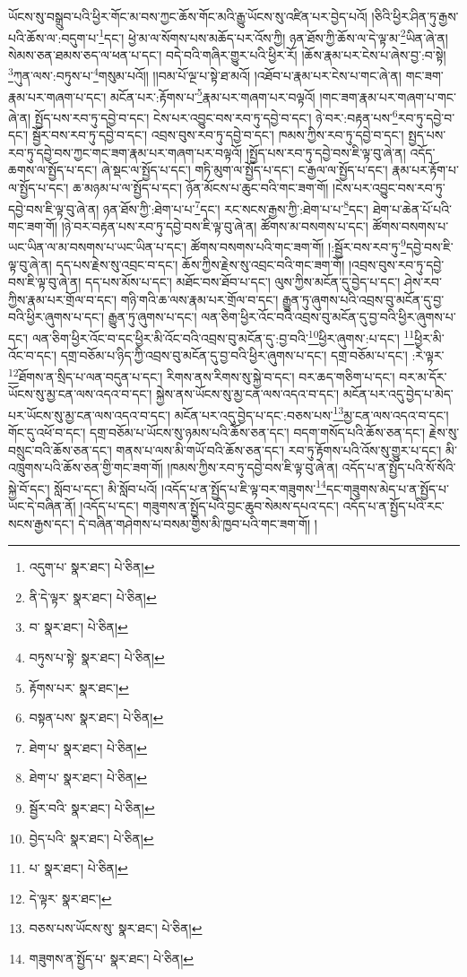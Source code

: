 ཡོངས་སུ་བསྒྲུབ་པའི་ཕྱིར་གོང་མ་བས་ཀྱང་ཆོས་གོང་མའི་རྒྱུ་ཡོངས་སུ་འཛིན་པར་བྱེད་པའོ། །ཅིའི་ཕྱིར་ཤིན་ཏུ་རྒྱས་པའི་ཆོས་ལ་:བདུག་པ་\footnote{འདུག་པ་  སྣར་ཐང་།  པེ་ཅིན། }དང་། ཕྱེ་མ་ལ་སོགས་པས་མཆོད་པར་འོས་ཀྱི། ཉན་ཐོས་ཀྱི་ཆོས་ལ་དེ་ལྟ་མ་\footnote{ནི་དེ་ལྟར་  སྣར་ཐང་།  པེ་ཅིན། }ཡིན་ཞེ་ན། སེམས་ཅན་ཐམས་ཅད་ལ་ཕན་པ་དང་། བདེ་བའི་གཞིར་གྱུར་པའི་ཕྱིར་རོ། །ཆོས་རྣམ་པར་ངེས་པ་ཞེས་བྱ་:བ་སྟེ། \footnote{བ་  སྣར་ཐང་།  པེ་ཅིན། }ཀུན་ལས་:བཏུས་པ་\footnote{བཏུས་པ་སྟེ་  སྣར་ཐང་།  པེ་ཅིན། }གསུམ་པའོ།། །།བམ་པོ་ལྔ་པ་སྟེ་ཐ་མའོ། །འཐོབ་པ་རྣམ་པར་ངེས་པ་གང་ཞེ་ན། གང་ཟག་རྣམ་པར་གཞག་པ་དང་། མངོན་པར་:རྟོགས་པ་\footnote{རྟོགས་པར་  སྣར་ཐང་། }རྣམ་པར་གཞག་པར་བལྟའོ། །གང་ཟག་རྣམ་པར་གཞག་པ་གང་ཞེ་ན། སྤྱོད་པས་རབ་ཏུ་དབྱེ་བ་དང་། ངེས་པར་འབྱུང་བས་རབ་ཏུ་དབྱེ་བ་དང་། ཉེ་བར་:བརྟན་པས་\footnote{བསྟན་པས་  སྣར་ཐང་།  པེ་ཅིན། }རབ་ཏུ་དབྱེ་བ་དང་། སྦྱོར་བས་རབ་ཏུ་དབྱེ་བ་དང་། འབྲས་བུས་རབ་ཏུ་དབྱེ་བ་དང་། ཁམས་ཀྱིས་རབ་ཏུ་དབྱེ་བ་དང་། སྤྱད་པས་རབ་ཏུ་དབྱེ་བས་ཀྱང་གང་ཟག་རྣམ་པར་གཞག་པར་བལྟའོ། །སྤྱོད་པས་རབ་ཏུ་དབྱེ་བས་ཇི་ལྟ་བུ་ཞེ་ན། འདོད་ཆགས་ལ་སྤྱོད་པ་དང་། ཞེ་སྡང་ལ་སྤྱོད་པ་དང་། གཏི་མུག་ལ་སྤྱོད་པ་དང་། ང་རྒྱལ་ལ་སྤྱོད་པ་དང་། རྣམ་པར་རྟོག་པ་ལ་སྤྱོད་པ་དང་། ཆ་མཉམ་པ་ལ་སྤྱོད་པ་དང་། ཉོན་མོངས་པ་ཆུང་བའི་གང་ཟག་གོ། །ངེས་པར་འབྱུང་བས་རབ་ཏུ་དབྱེ་བས་ཇི་ལྟ་བུ་ཞེ་ན། ཉན་ཐོས་ཀྱི་:ཐེག་པ་པ་\footnote{ཐེག་པ་  སྣར་ཐང་།  པེ་ཅིན། }དང་། རང་སངས་རྒྱས་ཀྱི་:ཐེག་པ་པ་\footnote{ཐེག་པ་  སྣར་ཐང་།  པེ་ཅིན། }དང་། ཐེག་པ་ཆེན་པོ་པའི་གང་ཟག་གོ། །ཉེ་བར་བརྟན་པས་རབ་ཏུ་དབྱེ་བས་ཇི་ལྟ་བུ་ཞེ་ན། ཚོགས་མ་བསགས་པ་དང་། ཚོགས་བསགས་པ་ཡང་ཡིན་ལ་མ་བསགས་པ་ཡང་ཡིན་པ་དང་། ཚོགས་བསགས་པའི་གང་ཟག་གོ། །:སྦྱོར་བས་རབ་ཏུ་\footnote{སྦྱོར་བའི་  སྣར་ཐང་།  པེ་ཅིན། }དབྱེ་བས་ཇི་ལྟ་བུ་ཞེ་ན། དད་པས་རྗེས་སུ་འབྲང་བ་དང་། ཆོས་ཀྱིས་རྗེས་སུ་འབྲང་བའི་གང་ཟག་གོ། །འབྲས་བུས་རབ་ཏུ་དབྱེ་བས་ཇི་ལྟ་བུ་ཞེ་ན། དད་པས་མོས་པ་དང་། མཐོང་བས་ཐོབ་པ་དང་། ལུས་ཀྱིས་མངོན་དུ་བྱེད་པ་དང་། ཤེས་རབ་ཀྱིས་རྣམ་པར་གྲོལ་བ་དང་། གཉི་གའི་ཆ་ལས་རྣམ་པར་གྲོལ་བ་དང་། རྒྱུན་ཏུ་ཞུགས་པའི་འབྲས་བུ་མངོན་དུ་བྱ་བའི་ཕྱིར་ཞུགས་པ་དང་། རྒྱུན་ཏུ་ཞུགས་པ་དང་། ལན་ཅིག་ཕྱིར་འོང་བའི་འབྲས་བུ་མངོན་དུ་བྱ་བའི་ཕྱིར་ཞུགས་པ་དང་། ལན་ཅིག་ཕྱིར་འོང་བ་དང་ཕྱིར་མི་འོང་བའི་འབྲས་བུ་མངོན་དུ་:བྱ་བའི་\footnote{བྱེད་པའི་  སྣར་ཐང་།  པེ་ཅིན། }ཕྱིར་ཞུགས་:པ་དང་། \footnote{པ་  སྣར་ཐང་།  པེ་ཅིན། }ཕྱིར་མི་འོང་བ་དང་། དགྲ་བཅོམ་པ་ཉིད་ཀྱི་འབྲས་བུ་མངོན་དུ་བྱ་བའི་ཕྱིར་ཞུགས་པ་དང་། དགྲ་བཅོམ་པ་དང་། :རེ་ལྟར་\footnote{དེ་ལྟར་  སྣར་ཐང་། }ཐོགས་ན་སྲིད་པ་ལན་བདུན་པ་དང་། རིགས་ནས་རིགས་སུ་སྐྱེ་བ་དང་། བར་ཆད་གཅིག་པ་དང་། བར་མ་དོར་ཡོངས་སུ་མྱ་ངན་ལས་འདའ་བ་དང་། སྐྱེས་ནས་ཡོངས་སུ་མྱ་ངན་ལས་འདའ་བ་དང་། མངོན་པར་འདུ་བྱེད་པ་མེད་པར་ཡོངས་སུ་མྱ་ངན་ལས་འདའ་བ་དང་། མངོན་པར་འདུ་བྱེད་པ་དང་:བཅས་པས་\footnote{བཅས་པས་ཡོངས་སུ་  སྣར་ཐང་།  པེ་ཅིན། }མྱ་ངན་ལས་འདའ་བ་དང་། གོང་དུ་འཕོ་བ་དང་། དགྲ་བཅོམ་པ་ཡོངས་སུ་ཉམས་པའི་ཆོས་ཅན་དང་། བདག་གསོད་པའི་ཆོས་ཅན་དང་། རྗེས་སུ་བསྲུང་བའི་ཆོས་ཅན་དང་། གནས་པ་ལས་མི་གཡོ་བའི་ཆོས་ཅན་དང་། རབ་ཏུ་རྟོགས་པའི་འོས་སུ་གྱུར་པ་དང་། མི་འཁྲུགས་པའི་ཆོས་ཅན་གྱི་གང་ཟག་གོ། །ཁམས་ཀྱིས་རབ་ཏུ་དབྱེ་བས་ཇི་ལྟ་བུ་ཞེ་ན། འདོད་པ་ན་སྤྱོད་པའི་སོ་སོའི་སྐྱེ་བོ་དང་། སློབ་པ་དང་། མི་སློབ་པའོ། །འདོད་པ་ན་སྤྱོད་པ་ཇི་ལྟ་བར་གཟུགས་\footnote{གཟུགས་ན་སྤྱོད་པ་  སྣར་ཐང་།  པེ་ཅིན། }དང་གཟུགས་མེད་པ་ན་སྤྱོད་པ་ཡང་དེ་བཞིན་ནོ། །འདོད་པ་དང་། གཟུགས་ན་སྤྱོད་པའི་བྱང་ཆུབ་སེམས་དཔའ་དང་། འདོད་པ་ན་སྤྱོད་པའི་རང་སངས་རྒྱས་དང་། དེ་བཞིན་གཤེགས་པ་བསམ་གྱིས་མི་ཁྱབ་པའི་གང་ཟག་གོ། །
